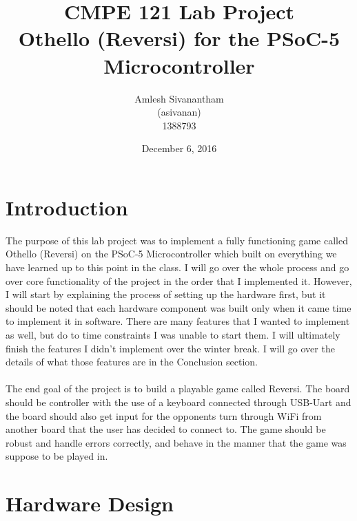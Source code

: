 \documentclass[a4paper, 12pt]{article}
\title{\textbf{CMPE 121 Lab Project} \\ 
    \textbf{Othello (Reversi) for the PSoC-5 Microcontroller}}
\author{Amlesh Sivanantham \\ (asivanan) \\ 1388793}
\date{December 6, 2016}
\begin{document}
	
	\maketitle

	\section{Introduction} 

	The purpose of this lab project was to implement a fully functioning
    game called Othello (Reversi) on the PSoC-5 Microcontroller which built
    on everything we have learned up to this point in the class.  
    I will go over the whole
    process and go over core functionality of the project in the order that I
    implemented it. However, I will start by explaining the process of
    setting up the hardware first, but it should be noted that each hardware
    component was built only when it came time to implement it in software.
    There are many features that I wanted to implement as well, but do to time
    constraints I was unable to start them. I will ultimately finish
    the features I didn't implement over the winter break. I will go over the
    details of what those features are in the Conclusion section.
    \\ \\
    The end goal of the project is to build a playable game called Reversi. The
    board should be controller with the use of a keyboard connected through
    USB-Uart and the board should also get input for the opponents turn through
    WiFi from another board that the user has decided to connect to. The game should
    be robust and handle errors correctly, and behave in the manner that the
    game was suppose to be played in.

    \section{Hardware Design}
 
\end{document}
